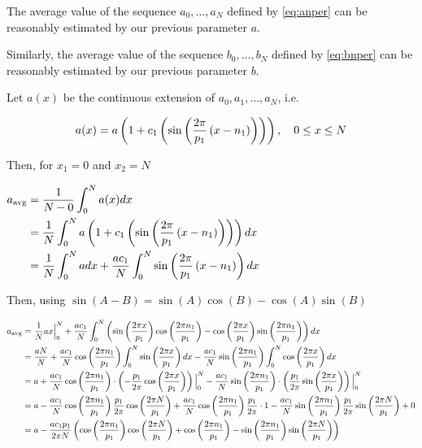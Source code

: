 \begin{prop}\label{thm:avgparam}
The average value of the sequence $a_0,\dots,a_N$ defined by \eqref{eq:anper} can be reasonably estimated by our previous parameter $a$.

Similarly, the average value of the sequence $b_0,\dots,b_N$ defined by \eqref{eq:bnper} can be reasonably estimated by our previous parameter $b$.

\begin{pf}
Let $a(x)$ be the continuous extension of $a_0,a_1,\dots,a_N$, i.e. 

\begin{equation} \label{eq:axfn}
    a(x)=a\left(1+c_1\left(\sin\left(\frac{2\pi}{p_1}\left(x-n_1\right)\right)\right)\right),\quad 0\leq x \leq N
\end{equation}

Then, for $x_1=0$ and $x_2=N$

$\begin{aligned}
a_{\text{avg}} 
&= \frac{1}{N-0}\int_0^N a(x)dx \\
&= \frac{1}{N}\int_0^N a\left(1+c_1\left(\sin\left(\frac{2\pi}{p_1}\left(x-n_1\right)\right)\right)\right)dx\\
&= \frac1N \int_0^N a dx +  \frac{ac_1}{N} \int_0^N \sin\left(\frac{2\pi}{p_1}\left(x-n_1\right)\right) dx
\end{aligned}$

Then, using  $\sin(A-B) = \sin(A)\cos(B) - \cos(A)\sin(B)$

$\begin{aligned}
a_{\text{avg}} 
&= \frac1N ax\Big|_0^N  + \frac{ac_1}{N} \int_0^N \left(\sin\left(\frac{2\pi x}{p_1}\right)\cos\left(\frac{2\pi n_1}{p_1}\right) - \cos\left(\frac{2\pi x}{p_1}\right)\sin\left(\frac{2\pi n_1}{p_1}\right)\right)dx\\
&= \frac{aN}{N}  
+ \frac{ac_1}{N} \cos\left(\frac{2\pi n_1}{p_1}\right) \int_0^N \sin\left(\frac{2\pi x}{p_1}\right)dx 
-   \frac{ac_1}{N} \sin\left(\frac{2\pi n_1}{p_1}\right) \int_0^N \cos\left(\frac{2\pi x}{p_1}\right)dx\\
&= a 
+  \frac{ac_1}{N} \cos\left(\frac{2\pi n_1}{p_1}\right)  \cdot \left(- \frac{p_1}{2\pi}  \cos\left(\frac{2\pi x}{p_1}\right)\right)\Big|_0^N 
-   \frac{ac_1}{N} \sin\left(\frac{2\pi n_1}{p_1}\right)  \cdot \left( \frac{p_1}{2\pi}  \sin\left(\frac{2\pi x}{p_1}\right)\right)\Big|_0^N \\
&= a 
-\frac{ac_1}{N} \cos\left(\frac{2\pi n_1}{p_1}\right) \frac{p_1}{2\pi} \cos\left(\frac{2\pi N}{p_1}\right) 
+\frac{ac_1}{N}\cos\left(\frac{2\pi n_1}{p_1}\right) \frac{p_1}{2\pi}  \cdot 1
-\frac{ac_1}{N} \sin\left(\frac{2\pi n_1}{p_1}\right) \frac{p_1}{2\pi}  \sin\left(\frac{2\pi N}{p_1}\right)
+0\\
&= a 
-\frac{ac_1 p_1}{2\pi N} \left(\cos\left(\frac{2\pi n_1}{p_1}\right)\cos\left(\frac{2\pi N}{p_1}\right) 
+\cos\left(\frac{2\pi n_1}{p_1}\right) 
-\sin\left(\frac{2\pi n_1}{p_1}\right)  \sin\left(\frac{2\pi N}{p_1}\right)\right)
\end{aligned}$



\end{pf}
\end{prop}
